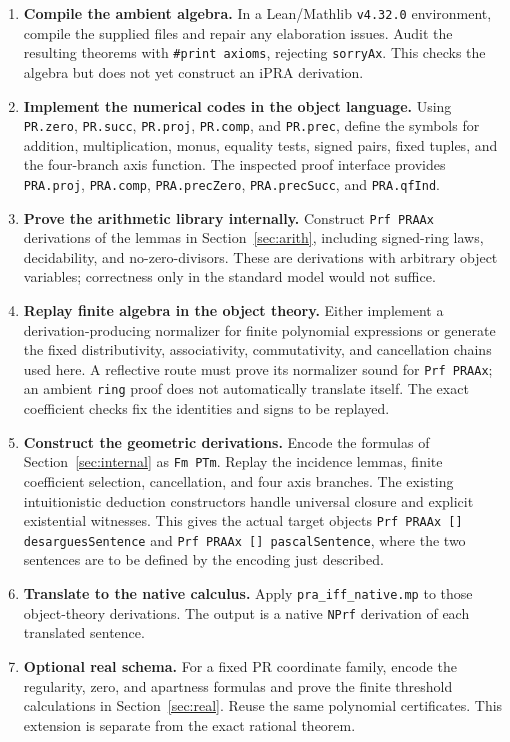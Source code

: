 \begin{enumerate}
\item \textbf{Compile the ambient algebra.} In a Lean/Mathlib
\texttt{v4.32.0} environment, compile the supplied files and repair any
elaboration issues. Audit the resulting theorems with
\texttt{\#print axioms}, rejecting \texttt{sorryAx}. This checks the
algebra but does not yet construct an iPRA derivation.

\item \textbf{Implement the numerical codes in the object language.}
Using \texttt{PR.zero}, \texttt{PR.succ}, \texttt{PR.proj},
\texttt{PR.comp}, and \texttt{PR.prec}, define the symbols for addition,
multiplication, monus, equality tests, signed pairs, fixed tuples, and
the four-branch axis function. The inspected proof interface provides
\texttt{PRA.proj}, \texttt{PRA.comp}, \texttt{PRA.precZero},
\texttt{PRA.precSucc}, and \texttt{PRA.qfInd}.

\item \textbf{Prove the arithmetic library internally.}
Construct \texttt{Prf PRAAx} derivations of the lemmas in
Section~\ref{sec:arith}, including signed-ring laws, decidability, and
no-zero-divisors. These are derivations with arbitrary object variables;
correctness only in the standard model would not suffice.

\item \textbf{Replay finite algebra in the object theory.}
Either implement a derivation-producing normalizer for finite polynomial
expressions or generate the fixed distributivity, associativity,
commutativity, and cancellation chains used here. A reflective route
must prove its normalizer sound for \texttt{Prf PRAAx}; an ambient
\texttt{ring} proof does not automatically translate itself. The exact
coefficient checks fix the identities and signs to be replayed.

\item \textbf{Construct the geometric derivations.}
Encode the formulas of Section~\ref{sec:internal} as \texttt{Fm PTm}.
Replay the incidence lemmas, finite coefficient selection, cancellation,
and four axis branches. The existing intuitionistic deduction
constructors handle universal closure and explicit existential witnesses.
This gives the actual target objects
\texttt{Prf PRAAx [] desarguesSentence} and
\texttt{Prf PRAAx [] pascalSentence}, where the two sentences are to
be defined by the encoding just described.

\item \textbf{Translate to the native calculus.}
Apply \texttt{pra\_iff\_native.mp} to those object-theory derivations.
The output is a native \texttt{NPrf} derivation of each translated sentence.

\item \textbf{Optional real schema.}
For a fixed PR coordinate family, encode the regularity, zero, and
apartness formulas and prove the finite threshold calculations in
Section~\ref{sec:real}. Reuse the same polynomial certificates. This
extension is separate from the exact rational theorem.
\end{enumerate}

